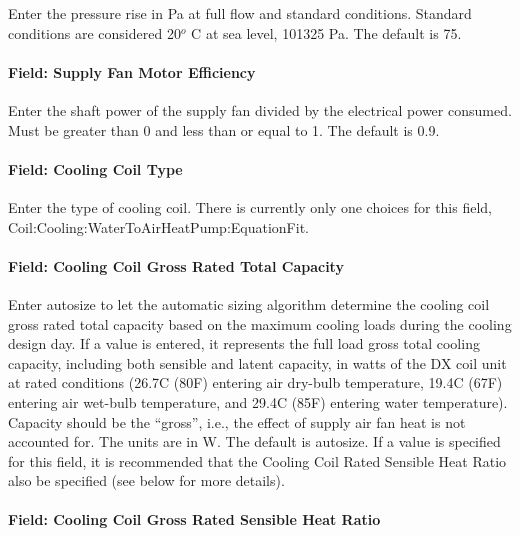 Enter the pressure rise in Pa at full flow and standard conditions. Standard conditions are considered 20\(^{o}\) C at sea level, 101325 Pa. The default is 75.

\paragraph{Field: Supply Fan Motor Efficiency}\label{field-supply-fan-motor-efficiency-3}

Enter the shaft power of the supply fan divided by the electrical power consumed. Must be greater than 0 and less than or equal to 1. The default is 0.9.

\paragraph{Field: Cooling Coil Type}\label{field-cooling-coil-type-3}

Enter the type of cooling coil. There is currently only one choices for this field, Coil:Cooling:WaterToAirHeatPump:EquationFit.

\paragraph{Field: Cooling Coil Gross Rated Total Capacity}\label{field-cooling-coil-gross-rated-total-capacity-2}

Enter autosize to let the automatic sizing algorithm determine the cooling coil gross rated total capacity based on the maximum cooling loads during the cooling design day. If a value is entered, it represents the full load gross total cooling capacity, including both sensible and latent capacity, in watts of the DX coil unit at rated conditions (26.7C (80F) entering air dry-bulb temperature, 19.4C (67F) entering air wet-bulb temperature, and 29.4C (85F) entering water temperature). Capacity should be the ``gross'', i.e., the effect of supply air fan heat is not accounted for. The units are in W. The default is autosize. If a value is specified for this field, it is recommended that the Cooling Coil Rated Sensible Heat Ratio also be specified (see below for more details).

\paragraph{Field: Cooling Coil Gross Rated Sensible Heat Ratio}\label{field-cooling-coil-gross-rated-sensible-heat-ratio-2}

